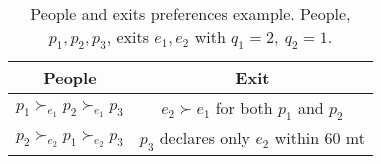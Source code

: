 \begin{table}[!htb]
    \centering
    \begin{tabular}{c|c}
        \hline People & Exit \\
        \hline \(p_1 \succ_{e_1} p_2 \succ_{e_1} p_3\) & \(e_2 \succ e_1\) for both \(p_1\) and \(p_2\) \\
        \(p_2 \succ_{e_2} p_1 \succ_{e_2} p_3\) & \(p_3\) declares only \(e_2\) within 60 mt \\
        \hline
    \end{tabular}
    \caption{People and exits preferences example. People, \(p_1, p_2, p_3\), exits \(e_1, e_2\) with \( q_1 = 2, \ q_2 = 1\).}
    \label{tab:people-exit}
\end{table}
